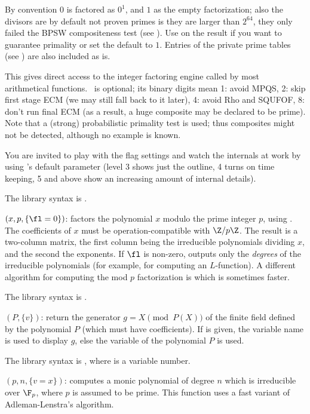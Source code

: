 By convention $0$ is factored as $0^1$, and $1$ as the empty factorization;
also the divisors are by default not proven primes is they are larger than
$2^64$, they only failed the BPSW compositeness test (see
). Use  on the result if you want to
guarantee primality or set the  default to $1$.
Entries of the private prime tables (see ) are also included
as is.

This gives direct access to the integer factoring engine called by most
arithmetical functions. \fl\ is optional; its binary digits mean 1: avoid
MPQS, 2: skip first stage ECM (we may still fall back to it later), 4: avoid
Rho and SQUFOF, 8: don't run final ECM (as a result, a huge composite may be
declared to be prime). Note that a (strong) probabilistic primality test is
used; thus composites might not be detected, although no example is known.

You are invited to play with the flag settings and watch the internals at
work by using 's  default parameter (level 3 shows
just the outline, 4 turns on time keeping, 5 and above show an increasing
amount of internal details).

The library syntax is .

$(x,p,\{\fl=0\})$: \label{se:factormod}factors the polynomial $x$ modulo the prime integer $p$, using
. The coefficients of $x$ must be operation-compatible with
$\Z/p\Z$. The result is a two-column matrix, the first column being the
irreducible polynomials dividing $x$, and the second the exponents. If $\fl$
is non-zero, outputs only the \emph{degrees} of the irreducible polynomials
(for example, for computing an $L$-function). A different algorithm for
computing the mod $p$ factorization is  which is sometimes
faster.

The library syntax is .

$(P,\{v\})$: \label{se:ffgen}return the generator $g=X \pmod{P(X)}$ of the
finite field defined by the polynomial $P$ (which must have 
coefficients). If  is given, the variable name is used to display $g$,
else the variable of the polynomial $P$ is used.

The library syntax is , where  is a variable number.

$(p,n,\{v=x\})$: \label{se:ffinit}computes a monic polynomial of degree $n$ which is irreducible over
 $\F_p$, where $p$ is assumed to be prime. This function uses a fast variant
 of Adleman-Lenstra's algorithm.

